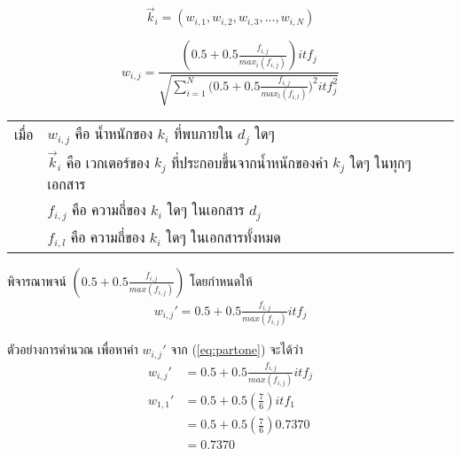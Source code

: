 \documentclass[11pt,a4paper]{article}
\begin{document}
{    \begin{equation}
        \label{eq:kvector}
        \overrightarrow{k}_i = (w_{i,1}, w_{i,2}, w_{i,3}, ..., w_{i,N})
    \end{equation}

    \begin{equation}
        \label{eq:weightcal}
        w_{i,j} = \frac{(0.5 + 0.5\frac{f_{i,j}}{max_i(f_{i,j})}) itf_{j}}
                       {\sqrt{\sum_{i=1}^{N}({0.5 + 0.5\frac{f_{i,j}}{max_l(f_{i,l})})^2 itf_j^2}}}
    \end{equation}

    \begin{table}[ht!]
        \begin{tabular}{p{1cm}l}
            เมื่อ & $w_{i,j}$ คือ น้ำหนักของ $k_i$ ที่พบภายใน $d_j$ ใดๆ \\
                & $\overrightarrow{k}_i$ คือ เวกเตอร์ของ $k_j$ ที่ประกอบขึ้นจากน้ำหนักของคำ $k_j$ ใดๆ ในทุกๆ เอกสาร \\
                & $f_{i,j}$ คือ ความถี่ของ $k_i$ ใดๆ ในเอกสาร $d_j$ \\
                & $f_{i,l}$ คือ ความถี่ของ $k_i$ ใดๆ ในเอกสารทั้งหมด \\
        \end{tabular}
    \end{table}

    พิจารณาพจน์ $(0.5 + 0.5\frac{f_{i,j}}{max(f_{i,j})})$ โดยกำหนดให้ 
    \begin{equation}
        \label{eq:partone}
        \begin{aligned}
            w_{i,j}' = 0.5 + 0.5\frac{f_{i,j}}{max(f_{i,j})} itf_j
        \end{aligned}
    \end{equation}

    ตัวอย่างการคำนวณ เพื่อหาค่า $w_{i,j}'$ จาก (\ref{eq:partone}) จะได้ว่า
    \begin{equation*}
        \begin{aligned}
            w_{i,j}'    &= 0.5 + 0.5\frac{f_{i,j}}{max(f_{i,j})} itf_j \\
             w_{1,1}'   &= 0.5 + 0.5(\frac{7}{6}) itf_1 \\
                        &= 0.5 + 0.5(\frac{7}{6}) 0.7370 \\
                        &= 0.7370 
        \end{aligned}
    \end{equation*}

}
\end{document}
